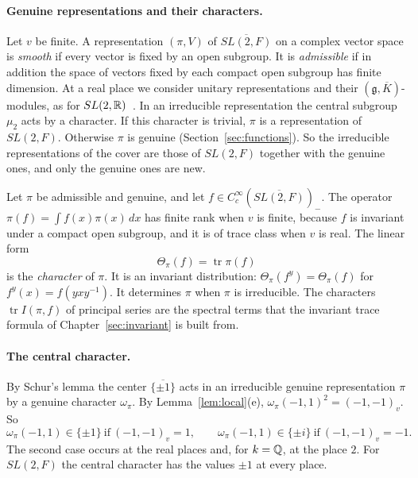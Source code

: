 \paragraph{Genuine representations and their characters.} Let $v$ be
finite. A representation $(\pi,V)$ of $\overline{SL(2,F)}$ on a complex
vector space is \emph{smooth} if every vector is fixed by an open
subgroup. It is \emph{admissible} if in addition the space of vectors
fixed by each compact open subgroup has finite dimension. At a real
place we consider unitary representations and their
$(\mathfrak g,\overline K)$-modules, as for $SL(2,\mathbb{R})$~\cite{Kn02}. In an
irreducible representation the central subgroup $\mu_2$ acts by a
character. If this character is trivial, $\pi$ is a representation of
$SL(2,F)$. Otherwise $\pi$ is genuine (Section~\ref{sec:functions}). So
the irreducible representations of the cover are those of $SL(2,F)$
together with the genuine ones, and only the genuine ones are new.

Let $\pi$ be admissible and genuine, and let $f\in C_c^\infty(
\overline{SL(2,F)})_-$. The operator $\pi(f)=\int f(x)\pi(x)\,dx$ has
finite rank when $v$ is finite, because $f$ is invariant under a compact
open subgroup, and it is of trace class when $v$ is real. The linear form
\[
\Theta_\pi(f)=\operatorname{tr}\pi(f)
\]
is the \emph{character} of $\pi$. It is an invariant distribution:
$\Theta_\pi(f^y)=\Theta_\pi(f)$ for $f^y(x)=f(yxy^{-1})$. It determines
$\pi$ when $\pi$ is irreducible. The characters $\operatorname{tr}I(\pi,f)$ of
principal series are the spectral terms that the invariant trace formula
of Chapter~\ref{sec:invariant} is built from.

\paragraph{The central character.} By Schur's lemma the center
$\overline{\{\pm1\}}$ acts in an irreducible genuine representation $\pi$
by a genuine character $\omega_\pi$. By Lemma~\ref{lem:local}(e),
$\omega_\pi(-1,1)^2=(-1,-1)_v$. So
\[
\omega_\pi(-1,1)\in\{\pm1\}\ \text{if}\ (-1,-1)_v=1,\qquad
\omega_\pi(-1,1)\in\{\pm i\}\ \text{if}\ (-1,-1)_v=-1 .
\]
The second case occurs at the real places and, for $k=\mathbb{Q}$, at the place
$2$. For $SL(2,F)$ the central character has the values $\pm1$ at every
place.

